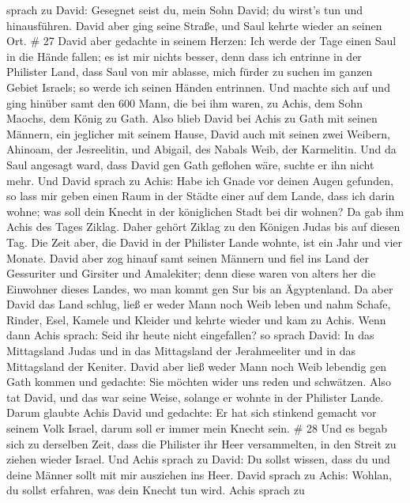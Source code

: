 sprach zu David: Gesegnet seist du, mein Sohn David; du wirst's tun und
hinausführen. David aber ging seine Straße, und Saul kehrte wieder an
seinen Ort. \# 27  David aber gedachte in seinem Herzen: Ich
werde der Tage einen Saul in die Hände fallen; es ist mir nichts besser,
denn dass ich entrinne in der Philister Land, dass Saul von mir ablasse,
mich fürder zu suchen im ganzen Gebiet Israels; so werde ich seinen
Händen entrinnen.  Und machte sich auf und ging hinüber samt
den 600 Mann, die bei ihm waren, zu Achis, dem Sohn Maochs, dem König zu
Gath.  Also blieb David bei Achis zu Gath mit seinen
Männern, ein jeglicher mit seinem Hause, David auch mit seinen zwei
Weibern, Ahinoam, der Jesreelitin, und Abigail, des Nabals Weib, der
Karmelitin.  Und da Saul angesagt ward, dass David gen Gath
geflohen wäre, suchte er ihn nicht mehr.  Und David sprach
zu Achis: Habe ich Gnade vor deinen Augen gefunden, so lass mir geben
einen Raum in der Städte einer auf dem Lande, dass ich darin wohne; was
soll dein Knecht in der königlichen Stadt bei dir wohnen? 
Da gab ihm Achis des Tages Ziklag. Daher gehört Ziklag zu den Königen
Judas bis auf diesen Tag.  Die Zeit aber, die David in der
Philister Lande wohnte, ist ein Jahr und vier Monate.  David
aber zog hinauf samt seinen Männern und fiel ins Land der Gessuriter und
Girsiter und Amalekiter; denn diese waren von alters her die Einwohner
dieses Landes, wo man kommt gen Sur bis an Ägyptenland.  Da
aber David das Land schlug, ließ er weder Mann noch Weib leben und nahm
Schafe, Rinder, Esel, Kamele und Kleider und kehrte wieder und kam zu
Achis.  Wenn dann Achis sprach: Seid ihr heute nicht
eingefallen? so sprach David: In das Mittagsland Judas und in das
Mittagsland der Jerahmeeliter und in das Mittagsland der Keniter.
 David aber ließ weder Mann noch Weib lebendig gen Gath
kommen und gedachte: Sie möchten wider uns reden und schwätzen. Also tat
David, und das war seine Weise, solange er wohnte in der Philister
Lande.  Darum glaubte Achis David und gedachte: Er hat sich
stinkend gemacht vor seinem Volk Israel, darum soll er immer mein Knecht
sein. \# 28  Und es begab sich zu derselben Zeit, dass die
Philister ihr Heer versammelten, in den Streit zu ziehen wieder Israel.
Und Achis sprach zu David: Du sollst wissen, dass du und deine Männer
sollt mit mir ausziehen ins Heer.  David sprach zu Achis:
Wohlan, du sollst erfahren, was dein Knecht tun wird. Achis sprach zu
